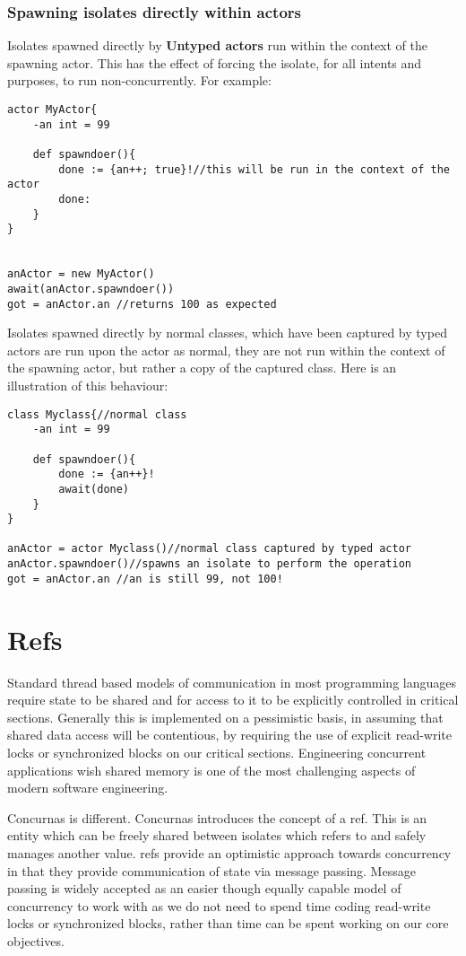 \documentclass[conc-doc]{subfiles}
\begin{document}
\subsubsection{Spawning isolates directly within actors}

Isolates spawned directly by \textbf{Untyped actors} run within the context of the spawning actor. This has the effect of forcing the isolate, for all intents and purposes, to run non-concurrently. For example:

\begin{lstlisting}
actor MyActor{
	-an int = 99
	
	def spawndoer(){
		done := {an++; true}!//this will be run in the context of the actor
		done:
	}
}


anActor = new MyActor()
await(anActor.spawndoer())
got = anActor.an //returns 100 as expected
\end{lstlisting}

Isolates spawned directly by normal classes, which have been captured by typed actors are run upon the actor as normal, they are not run within the context of the spawning actor, but rather a copy of the captured class. Here is an illustration of this behaviour:
\begin{lstlisting}
class Myclass{//normal class
	-an int = 99
	
	def spawndoer(){
		done := {an++}!
		await(done)	
	}
}

anActor = actor Myclass()//normal class captured by typed actor
anActor.spawndoer()//spawns an isolate to perform the operation
got = anActor.an //an is still 99, not 100!
\end{lstlisting}


\section{Refs}
\label{sec:refs}
Standard thread based models of communication in most programming languages require state to be shared and for access to it to be explicitly controlled in critical sections. Generally this is implemented on a pessimistic basis, in assuming that shared data access will be contentious, by requiring the use of explicit read-write locks or synchronized blocks on our critical sections. Engineering concurrent applications wish shared memory is one of the most challenging aspects of modern software engineering.

Concurnas is different. Concurnas introduces the concept of a ref. This is an entity which can be freely shared between isolates which refers to and safely manages another value. refs provide an optimistic approach towards concurrency in that they provide communication of state via message passing. Message passing is widely accepted as an easier though equally capable model of concurrency to work with as we do not need to spend time coding read-write locks or synchronized blocks, rather than time can be spent working on our core objectives.
\end{document}
